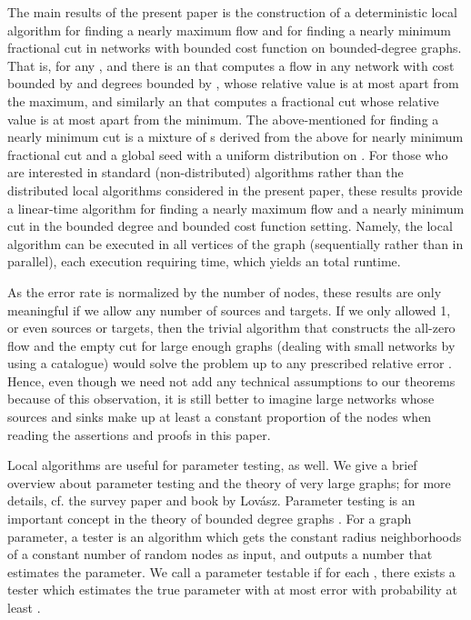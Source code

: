 \documentclass[12pt,a4paper]{article}
\renewcommand{\:}{\colon}
\begin{document}
The main results of the present paper is the construction of a deterministic local algorithm for finding a nearly maximum flow and for finding a nearly minimum fractional cut in networks with bounded cost function on bounded-degree graphs. 
That is, for any ,  and  there is an  that computes a flow in any network with cost bounded by  and degrees bounded by , whose relative value is at most  apart from the maximum, and similarly an  that computes a fractional cut whose relative value is at most  apart from the minimum. 
The above-mentioned  for finding a nearly minimum cut is a mixture of s derived from the above  for nearly minimum fractional cut and a global seed  with a uniform distribution on . 
For those who are interested in standard (non-distributed) algorithms rather than the distributed local algorithms considered in the present paper, these results provide a linear-time algorithm for finding a nearly maximum flow and a nearly minimum cut in the bounded degree and bounded cost function setting. 
Namely, the local algorithm can be executed in all vertices of the graph (sequentially rather than in parallel), each execution requiring  time, which yields an  total runtime. 

As the error rate is normalized by the number of nodes, these results are only meaningful if we allow any number of sources and targets. 
If we only allowed 1, or even  sources or targets, then the trivial algorithm that constructs the all-zero flow and the empty cut for large enough graphs (dealing with small networks by using a catalogue) would solve the problem up to any prescribed relative error . 
Hence, even though we need not add any technical assumptions to our theorems because of this observation, it is still better to imagine large networks whose sources and sinks make up at least a constant proportion of the nodes when reading the assertions and proofs in this paper. 



Local algorithms are useful for parameter testing, as well. 
We give a brief overview about parameter testing and the theory of very large graphs; for more details, cf. the survey paper and book \cite{Lovasz, Lovaszbook} by Lov\'asz. 
Parameter testing is an important concept in the theory of bounded degree graphs \cite{BeSchSh, BObT, CzuShaSo, Elek2, Elek, LOW, MaRo, NgOn}. 
For a graph parameter, a tester is an algorithm which gets the constant radius neighborhoods of a constant number of random nodes as input, and outputs a number that estimates the parameter. 
We call a parameter testable if for each , there exists a tester which estimates the true parameter with at most  error with probability at least .
\end{document}
